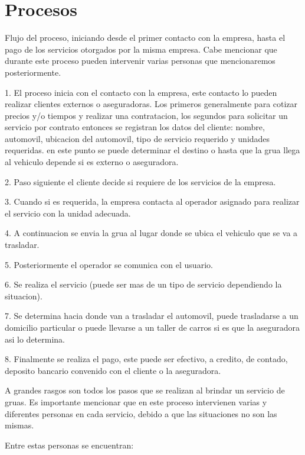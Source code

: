 \section{Procesos}
\begin{description}
\item Flujo del proceso, iniciando desde el primer contacto con la empresa, hasta el pago de los servicios otorgados por la misma empresa. Cabe mencionar que durante este proceso pueden intervenir varias personas que mencionaremos posteriormente.
\item 1. El proceso inicia con el contacto con la empresa, este contacto lo pueden realizar clientes externos o aseguradoras.
Los primeros generalmente para cotizar precios y/o tiempos y realizar una contratacion, los segundos para solicitar un servicio por contrato entonces se registran los datos del cliente: nombre, automovil, ubicacion del automovil, tipo de servicio requerido y unidades requeridas. en este punto se puede determinar el destino o hasta que la grua llega al vehiculo depende si es externo o aseguradora.
\item 2. Paso siguiente el cliente decide si requiere de los servicios de la empresa.
\item 3. Cuando si es requerida, la empresa contacta al operador asignado para realizar el servicio con la unidad adecuada.
\item 4. A continuacion se envia la grua al lugar donde se ubica el vehiculo que se va a trasladar.
\item 5. Posteriormente el operador se comunica con el usuario.
\item 6. Se realiza el servicio (puede ser mas de un tipo de servicio dependiendo la situacion).
\item 7. Se determina hacia donde van a trasladar el automovil, puede trasladarse a un domicilio particular o puede llevarse a un taller de carros si es que la aseguradora asi lo determina.
\item 8. Finalmente se realiza el pago, este puede ser efectivo, a credito, de contado, deposito bancario convenido con el cliente o la aseguradora.
\item A grandes rasgos son todos los pasos que se realizan al brindar un servicio de gruas. Es importante mencionar que en este proceso intervienen varias y diferentes personas en cada servicio, debido a que las situaciones no son las mismas. \item Entre estas personas se encuentran: 

\end{description}
